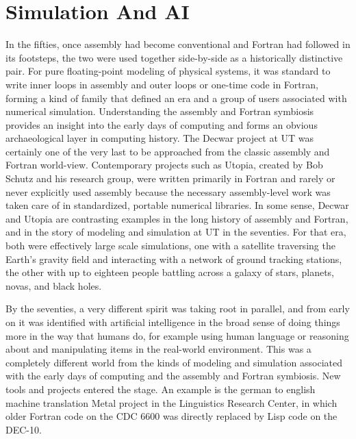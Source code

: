 \section{Simulation And AI}

In the fifties, once assembly had become conventional and Fortran had followed in its footsteps, the two were used together side-by-side as a historically distinctive pair. For pure floating-point modeling of physical systems, it was standard to write inner loops in assembly and outer loops or one-time code in Fortran, forming a kind of family that defined an era and a group of users associated with numerical simulation. Understanding the assembly and Fortran symbiosis provides an insight into the early days of computing and forms an obvious archaeological layer in computing history. The Decwar project at UT was certainly one of the very last to be approached from the classic assembly and Fortran world-view. Contemporary projects such as Utopia, created by Bob Schutz and his research group, were written primarily in Fortran and rarely or never explicitly used assembly because the necessary assembly-level work was taken care of in standardized, portable numerical libraries. In some sense, Decwar and Utopia are contrasting examples in the long history of assembly and Fortran, and in the story of modeling and simulation at UT in the seventies. For that era, both were effectively large scale simulations, one with a satellite traversing the Earth’s gravity field and interacting with a network of ground tracking stations, the other with up to eighteen people battling across a galaxy of stars, planets, novas, and black holes.

By the seventies, a very different spirit was taking root in parallel, and from early on it was identified with artificial intelligence in the broad sense of doing things more in the way that humans do, for example using human language or reasoning about and manipulating items in the real-world environment. This was a completely different world from the kinds of modeling and simulation associated with the early days of computing and the assembly and Fortran symbiosis. New tools and projects entered the stage. An example is the german to english machine translation Metal project in the Linguistics Research Center, in which older Fortran code on the CDC 6600 was directly replaced by Lisp code on the DEC-10.


